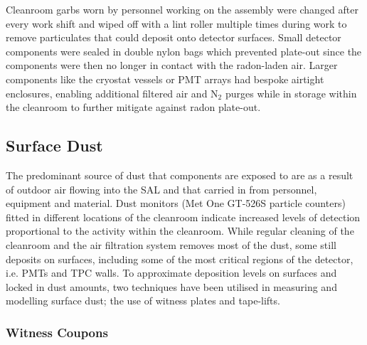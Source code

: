 Cleanroom garbs worn by personnel working on the assembly were changed after every work shift and wiped off with a lint roller multiple times during work to remove particulates that could deposit onto detector surfaces. Small detector components were sealed in double nylon bags which prevented plate-out since the components were then no longer in contact with the radon-laden air. Larger components like the cryostat vessels or PMT arrays had bespoke airtight enclosures, enabling additional filtered air and N$_{2}$ purges while in storage within the cleanroom to further mitigate against radon plate-out.


\subsection{Surface Dust}
\label{secsec:surface_dust}

The predominant source of dust that components are exposed to are as a result of outdoor air flowing into the SAL and that carried in from personnel, equipment and material. Dust monitors (Met One GT-526S particle counters) fitted in different locations of the cleanroom indicate increased levels of detection proportional to the activity within the cleanroom. While regular cleaning of the cleanroom and the air filtration system removes most of the dust, some still deposits on surfaces, including some of the most critical regions of the detector, i.e. PMTs and TPC walls. To approximate deposition levels on surfaces and locked in dust amounts, two techniques have been utilised in measuring and modelling surface dust; the use of witness plates and tape-lifts. 


\subsubsection{Witness Coupons}

